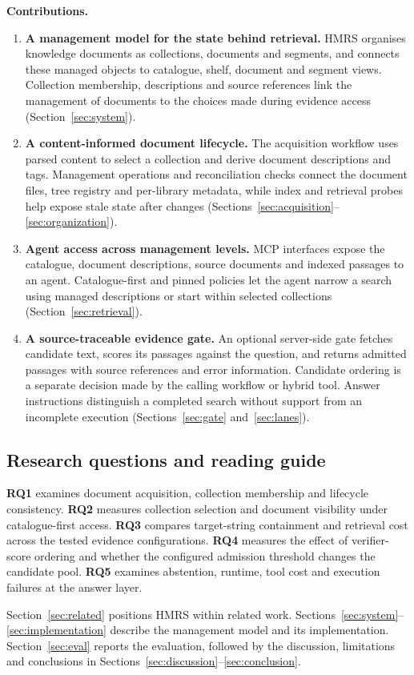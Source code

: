 \noindent\textbf{Contributions.}
\begin{enumerate}
\item \textbf{A management model for the state behind retrieval.} HMRS
organises knowledge documents as collections, documents and segments, and
connects these managed objects to catalogue, shelf, document and segment
views. Collection membership, descriptions and source references link the
management of documents to the choices made during evidence access
(Section~\ref{sec:system}).
\item \textbf{A content-informed document lifecycle.} The acquisition
workflow uses parsed content to select a collection and derive document
descriptions and tags. Management operations and reconciliation checks
connect the document files, tree registry and per-library metadata, while
index and retrieval probes help expose stale state after changes
(Sections~\ref{sec:acquisition}--\ref{sec:organization}).
\item \textbf{Agent access across management levels.} MCP interfaces expose
the catalogue, document descriptions, source documents and indexed passages
to an agent. Catalogue-first and pinned policies let the agent narrow a
search using managed descriptions or start within selected collections
(Section~\ref{sec:retrieval}).
\item \textbf{A source-traceable evidence gate.} An optional server-side
gate fetches candidate text, scores its passages against the question, and
returns admitted passages with source references and error information.
Candidate ordering is a separate decision made by the calling workflow or
hybrid tool. Answer instructions distinguish a completed search without
support from an incomplete execution
(Sections~\ref{sec:gate} and~\ref{sec:lanes}).
\end{enumerate}

\subsection{Research questions and reading guide}
\label{sec:rq}

\textbf{RQ1} examines document acquisition, collection membership and
lifecycle consistency. \textbf{RQ2} measures collection selection and
document visibility under catalogue-first access. \textbf{RQ3} compares
target-string containment and retrieval cost across the tested evidence
configurations. \textbf{RQ4} measures the effect of verifier-score ordering
and whether the configured admission threshold changes the candidate pool.
\textbf{RQ5} examines abstention, runtime, tool cost and execution failures
at the answer layer.

Section~\ref{sec:related} positions HMRS within related work.
Sections~\ref{sec:system}--\ref{sec:implementation} describe the management
model and its implementation. Section~\ref{sec:eval} reports the evaluation,
followed by the discussion, limitations and conclusions in
Sections~\ref{sec:discussion}--\ref{sec:conclusion}.
